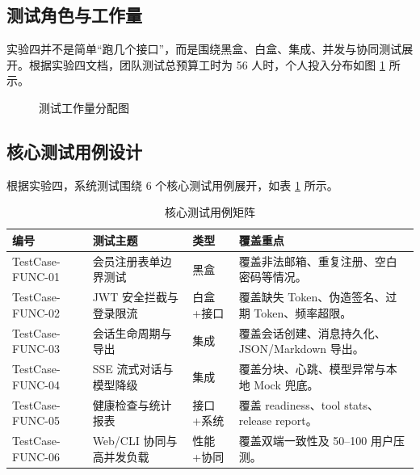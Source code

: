 \documentclass[12pt,a4paper,UTF8]{ctexart}
\begin{document}
\subsection{测试角色与工作量}
实验四并不是简单“跑几个接口”，而是围绕黑盒、白盒、集成、并发与协同测试展开。根据实验四文档，团队测试总预算工时为 56 人时，个人投入分布如图 \ref{fig:hours-chart} 所示。

\begin{figure}[H]
    \centering
    \caption{测试工作量分配图}
    \label{fig:hours-chart}
\end{figure}

\subsection{核心测试用例设计}
根据实验四，系统测试围绕 6 个核心测试用例展开，如表 \ref{tab:testcases} 所示。

\begin{table}[H]
    \centering
    \caption{核心测试用例矩阵}
    \label{tab:testcases}
    \begin{tabular}{p{2.8cm}p{2.4cm}p{1.6cm}p{4cm}}
        \toprule
        编号 & 测试主题 & 类型 & 覆盖重点 \\
        \midrule
        TestCase-FUNC-01 & 会员注册表单边界测试 & 黑盒 & 覆盖非法邮箱、重复注册、空白密码等情况。 \\
        TestCase-FUNC-02 & JWT 安全拦截与登录限流 & 白盒+接口 & 覆盖缺失 Token、伪造签名、过期 Token、频率超限。 \\
        TestCase-FUNC-03 & 会话生命周期与导出 & 集成 & 覆盖会话创建、消息持久化、JSON/Markdown 导出。 \\
        TestCase-FUNC-04 & SSE 流式对话与模型降级 & 集成 & 覆盖分块、心跳、模型异常与本地 Mock 兜底。 \\
        TestCase-FUNC-05 & 健康检查与统计报表 & 接口+系统 & 覆盖 readiness、tool stats、release report。 \\
        TestCase-FUNC-06 & Web/CLI 协同与高并发负载 & 性能+协同 & 覆盖双端一致性及 50--100 用户压测。 \\
        \bottomrule
    \end{tabular}
\end{table}
\end{document}
